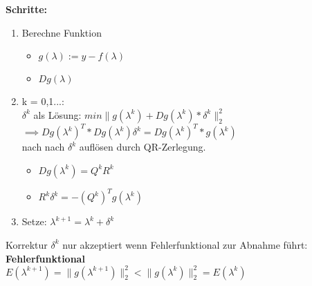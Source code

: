\documentclass[../ZF_HM2.tex]{subfiles}
\begin{document}
\begin{mdframed}
	\textbf{Schritte:\\}
	\begin{enumerate}
		\item Berechne Funktion
		\begin{itemize}
			\item $g(\lambda):= y-f(\lambda)$
			\item $Dg(\lambda)$
		\end{itemize}
		\item k = 0,1...:\\ $\delta^{k}$ als Lösung: $min\|g(\lambda^{k})+Dg(\lambda^{k})*\delta^{k}\|_2^{2}$\\
		$\implies Dg(\lambda^{k})^{T}*Dg(\lambda^{k})\delta^{k} = Dg(\lambda^{k})^{T}*g(\lambda^{k})$\\
		nach \colorbox{pink!30}{nach $\delta^{k}$ auflösen} durch QR-Zerlegung.
		\begin{itemize}
			\item \colorbox{pink!30}{$Dg(\lambda^{k})=Q^{k}R^{k}$}
			\item \colorbox{pink!30}{$R^{k}\delta^{k}=-(Q^{k})^{T}g(\lambda^{k})$}
		\end{itemize}
		\item Setze: \colorbox{pink!30}{$\lambda^{k+1} = \lambda^{k}+\delta^{k}$}

	\end{enumerate}
\end{mdframed}

Korrektur \colorbox{orange!30}{$\delta^{k}$} nur \colorbox{orange!30}{akzeptiert wenn} Fehlerfunktional zur Abnahme führt:
\textbf{Fehlerfunktional\\}\colorbox{magenta!30}{$E(\lambda^{k+1})=\|g(\lambda^{k+1})\|_2^2 < \|g(\lambda^{k})\|_2^2 = E(\lambda^{k})$}
\end{document}
